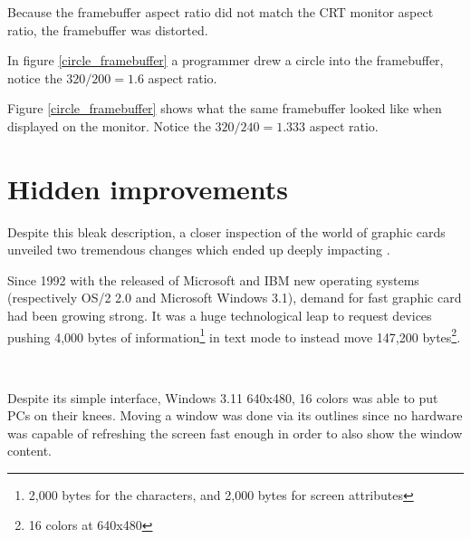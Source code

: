  \label{vga_ratio}
\par
\vspace{-2mm}
Because the framebuffer aspect ratio did not match the CRT monitor aspect ratio, the framebuffer was distorted.\\
\par
{}
\par
In figure \ref{circle_framebuffer} a programmer drew a circle into the framebuffer, notice the $ 320/200 = 1.6 $ aspect ratio.\\
\par
{}
\par
Figure \ref{circle_framebuffer} shows what the same framebuffer looked like when displayed on the monitor. Notice the $ 320/240 = 1.333 $ aspect ratio.\\







\section{Hidden improvements}
Despite this bleak description, a closer inspection of the world of graphic cards unveiled two tremendous changes which ended up deeply impacting \doom. \\
\par
Since 1992 with the released of Microsoft and IBM new operating systems (respectively OS/2 2.0 and Microsoft Windows 3.1), demand for fast graphic card had been growing strong. It was a huge technological leap to request devices pushing 4,000 bytes of information\footnote{2,000 bytes for the characters, and 2,000 bytes for screen attributes} in text mode to instead move 147,200 bytes\footnote{16 colors at 640x480}.

\\
\par 
Despite its simple interface, Windows 3.11 640x480, 16 colors was able to put PCs on their knees. Moving a window was done via its outlines since no hardware was capable of refreshing the screen fast enough in order to also show the window content.



